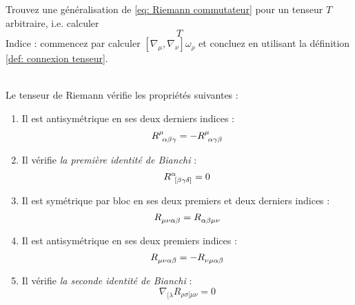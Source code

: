 \begin{exerc}
    Trouvez une généralisation de \ref{eq: Riemann commutateur} pour un tenseur $T$ arbitraire, i.e. calculer
    \begin{equation}
        [\nabla_\mu,\nabla_\nu] T
    \end{equation}
    Indice : commencez par calculer $[\nabla_\mu,\nabla_\nu] \omega_\rho$ et concluez en utilisant la définition \ref{def: connexion tenseur}.
\end{exerc}
\begin{theoremframe}
    \begin{propri}
        \label{prop:tenseur de Riemann}
        \,\\
        Le tenseur de Riemann vérifie les propriétés suivantes :
        \begin{enumerate}[label=\roman*.]
            \item Il est antisymétrique en ses deux derniers indices :
            \begin{equation}
                R\indices{^{\mu}_{\!\alpha \beta \gamma}} = -R\indices{^{\mu}_{\!\alpha \gamma \beta}}
            \end{equation}
            \item Il vérifie \emph{la première identité de Bianchi} :
            \begin{equation}
                R\indices{^{\alpha}_{\![\beta \gamma \delta]}} = 0
            \end{equation}
            \item Il est symétrique par bloc en ses deux premiers et deux derniers indices : 
            \begin{equation}
                R\indices{_{\mu \nu \alpha \beta}} = R\indices{_{\alpha \beta \mu \nu}}
             \end{equation}
            \item Il est antisymétrique en ses deux premiers indices : \begin{equation}
                R\indices{_{\mu \nu \alpha \beta}} = - R\indices{_{\nu \mu \alpha \beta}}
            \end{equation}
            \item Il vérifie \emph{la seconde identité de Bianchi} :
            \begin{equation}
                \nabla_{[\lambda} R_{\rho \sigma] \mu \nu} = 0
            \end{equation}
        \end{enumerate}
    \end{propri}
\end{theoremframe}
